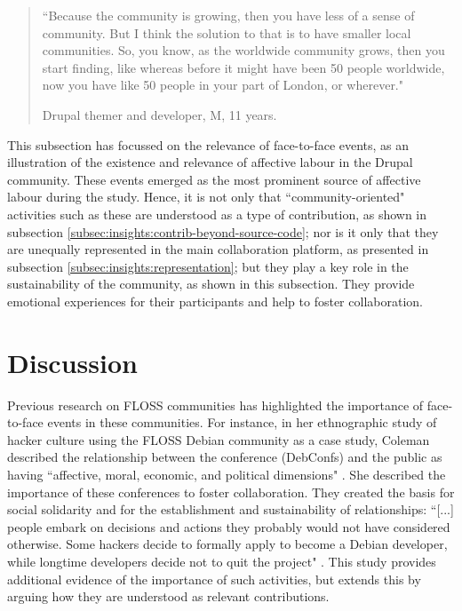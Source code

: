\begin{quotation}
    ``Because the community is growing, then you have less of a sense of community. But I think the solution to that is to have smaller local communities. So, you know, as the worldwide community grows, then you start finding, like whereas before it might have been 50 people worldwide, now you have like 50 people in your part of London, or wherever."

\begin{flushright}\footnotesize{Drupal themer and developer, M, 11 years.}\end{flushright}
\end{quotation}

This subsection has focussed on the relevance of face-to-face events, as an illustration of the existence and relevance of affective labour in the Drupal community. These events emerged as the most prominent source of affective labour during the study. Hence, it is not only that ``community-oriented" activities such as these are understood as a type of contribution, as shown in subsection \ref{subsec:insights:contrib-beyond-source-code}; nor is it only that they are unequally represented in the main collaboration platform, as presented in subsection \ref{subsec:insights:representation}; but they play a key role in the sustainability of the community, as shown in this subsection. They provide  emotional experiences for their participants and help to foster collaboration.

\section{Discussion}
\label{sec:discussion}

Previous research on FLOSS communities has highlighted the importance of face-to-face events in these communities. For instance, in her ethnographic study of hacker culture using the FLOSS Debian community as a case study, Coleman described the relationship between the conference (DebConfs) and the public as having ``affective, moral, economic, and political dimensions" \parencite[59]{coleman2013coding}.  She described the importance of these conferences to foster collaboration. They created the basis for social solidarity and for the establishment and sustainability of relationships: ``[...] people embark on decisions and actions they probably would not have considered otherwise. Some hackers decide to formally apply to become a Debian developer, while longtime developers  decide not to quit the project" \parencite[57]{coleman2013coding}. This study provides additional evidence of the importance of such activities, but extends this by arguing how they are understood as relevant contributions.

